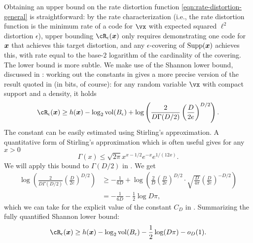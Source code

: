 \documentclass[../../book-main.tex]{subfiles}
\begin{document}
Obtaining an upper bound on the rate distortion function
\eqref{eqn:rate-distortion-general} is straightforward: by the rate
characterization (i.e., the rate distortion function is the minimum rate of
a code for $\vx$ with expected squared $\ell^2$ distortion $\epsilon$), upper
bounding $\cR_{\epsilon}(\x)$ only requires demonstrating one code for $\bm{x}$ that
achieves this target distortion, and any $\epsilon$-covering of $\operatorname{Supp}(\bm{x})$
achieves this, with rate equal to the base-$2$ logarithm of the cardinality of
the covering.
The lower bound is more subtle. We make use of the Shannon lower bound,
discussed in : working out the constants in \cite[\S III,
(22)]{Linder1994-ej} gives a more precise version of the result quoted in
 (in bits, of course): for any random variable $\vx$ with compact
support and a density, it holds
\begin{equation}\label{eq:slb-appendix-1}
    \cR_{\epsilon}(\x)
    \geq
    h(\x)
    - \log_2 \volume(B_{\epsilon})
    +
    \log
    \left(
    \frac{
    	2
    }
    {
    	D \Gamma(D/2)
    }
    \left(
    \frac{
    	D
    }
    {
    	2e
    }
    \right)^{D/2}
    \right).
\end{equation}
The constant can be easily estimated using Stirling's approximation.
A quantitative form of Stirling's approximation which is often useful gives
for any $x > 0$ \cite{Jameson2015-hy}
\begin{equation}
    \Gamma(x) \leq \sqrt{2\pi} x^{x - 1/2} e^{-x} e^{1/(12x)}.
\end{equation}
We will apply this bound to $\Gamma(D/2)$ in .
We get
\begin{align}
    \log
    \left(
    \frac{
        2
    }
    {
        D \Gamma(D/2)
    }
    \left(
    \frac{
        D
    }
    {
        2e
    }
    \right)^{D/2}
    \right)
    &\geq
    -\frac{1}{6D}
    +
    \log\left(
        \frac{2}{D} 
        \left(
        \frac{
            D
        }
        {
            2e
        }
        \right)^{D/2}
        \cdot
        \sqrt{\frac{D}{4\pi}}
        \left(
        \frac{D}{2e}
        \right)^{-D/2}
    \right)
    \\
    &=
    -\frac{1}{6D}
    - \frac{1}{2}\log D\pi,\label{eq:slb-constant-est}
\end{align}
which we can take for the explicit value of the constant $C_D$ in .
Summarizing the fully quantified Shannon lower bound:
\begin{equation}\label{eq:slb-appendix}
    \cR_{\epsilon}(\x)
    \geq
    h(\x)
    - \log_2 \volume(B_{\epsilon})
    - \frac{1}{2} \log(D\pi) - o_D(1).
\end{equation}
\end{document}
